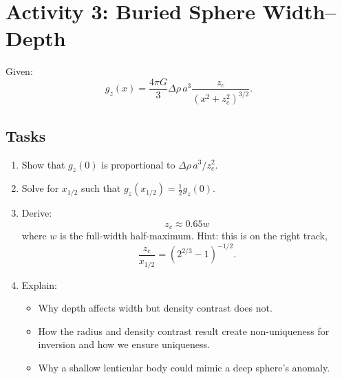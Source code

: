 \documentclass[11pt,a4paper]{article}
\begin{document}
\section*{Activity 3: Buried Sphere Width--Depth}

Given:
\[
  g_z(x) = \frac{4\pi G}{3}\Delta\rho\, a^3
          \frac{z_c}{(x^2+z_c^2)^{3/2}}.
\]

\subsection*{Tasks}
\begin{enumerate}
  \item Show that $g_z(0)$ is proportional to $\Delta\rho\,a^3/z_c^2$.
  \item Solve for $x_{1/2}$ such that $g_z(x_{1/2}) = \frac{1}{2}g_z(0)$.
  \item Derive:
  \[
    z_c \approx 0.65 w
  \]
  where \(w\) is the full-width half-maximum.  Hint: this is on the right track,
  \[
    \frac{z_c}{x_{1/2}} = (2^{2/3} - 1)^{-1/2}.
  \]
  \item Explain:  
        \begin{itemize}
          \item Why depth affects width but density contrast does not.  
          \item How the radius and density contrast result create non-uniqueness for inversion and how we ensure uniqueness.
          \item Why a shallow lenticular body could mimic a deep sphere's anomaly.
        \end{itemize}
\end{enumerate}
\end{document}
